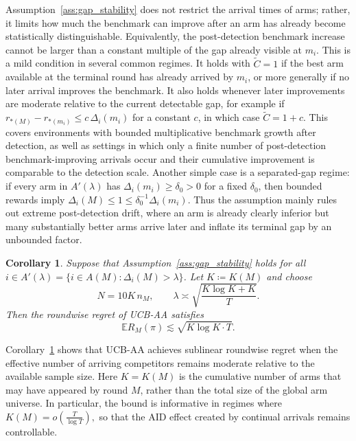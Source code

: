 \documentclass[11pt]{article}
\newtheorem{corollary}{Corollary}
\begin{document}
Assumption~\ref{ass:gap_stability} does not restrict the arrival times of arms;
rather, it limits how much the benchmark can improve after an arm has already
become statistically distinguishable. Equivalently, the post-detection benchmark
increase cannot be larger than a constant multiple of the gap already visible at
\(m_i\).
This is a mild condition in several common regimes. It holds with
\(\tilde C=1\) if the best arm available at the terminal round has already
arrived by \(m_i\), or more generally if no later arrival improves the benchmark.
It also holds whenever later improvements are moderate relative to the current
detectable gap, for example if
\(
r_{*(M)}-r_{*(m_i)}\le c\,\Delta_i(m_i)
\)
for a constant \(c\), in which case \(\tilde C=1+c\). This covers environments
with bounded multiplicative benchmark growth after detection, as well as
settings in which only a finite number of post-detection benchmark-improving
arrivals occur and their cumulative improvement is comparable to the detection
scale. Another simple case is a separated-gap regime: if every arm in
\(A'(\lambda)\) has \(\Delta_i(m_i)\ge \delta_0>0\) for a fixed \(\delta_0\),
then bounded rewards imply \(\Delta_i(M)\le 1\le \delta_0^{-1}\Delta_i(m_i)\).
Thus the assumption mainly rules out extreme post-detection drift, where an arm
is already clearly inferior but many substantially better arms arrive later and
inflate its terminal gap by an unbounded factor.


\begin{corollary}
\label{cor:ucb_aa_simplified}
Suppose that Assumption~\ref{ass:gap_stability} holds for all $i\in A'(\lambda)=\{i\in A(M):\Delta_i(M)>\lambda\}$. Let $K\coloneqq K(M)$ and choose
\[
N = 10K\,n_M,
\qquad
\lambda \asymp \sqrt{\frac{K\log K+K}{T}}.
\]
Then the roundwise regret of UCB-AA satisfies
\[
\mathbb{E}R_M(\pi)\lesssim \sqrt{K\log K\cdot T}.
\]
\end{corollary}

Corollary~\ref{cor:ucb_aa_simplified} shows that UCB-AA achieves sublinear roundwise regret when the effective
number of arriving competitors remains moderate relative to the available sample size.
Here \(K=K(M)\) is the cumulative number of arms that may have appeared by round \(M\),
rather than the total size of the global arm universe. In particular, the bound is informative
in regimes where \(
K(M)=o\left(\frac{T}{\log T}\right),
\)
so that the AID effect created by continual arrivals remains controllable.
\end{document}
